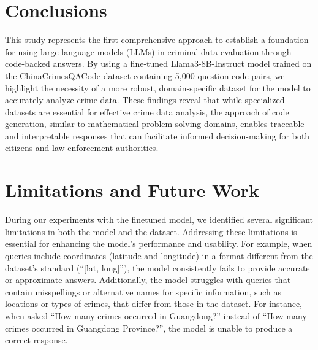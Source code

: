 
\section{Conclusions}



This study represents the first comprehensive approach to establish a foundation for using large language models (LLMs) in criminal data evaluation through code-backed answers. By using a fine-tuned Llama3-8B-Instruct model trained on the ChinaCrimesQACode dataset containing 5,000 question-code pairs, we highlight the necessity of a more robust, domain-specific dataset for the model to accurately analyze crime data. These findings reveal that while specialized datasets are essential for effective crime data analysis, the approach of code generation, similar to mathematical problem-solving domains, enables traceable and interpretable responses that can facilitate informed decision-making for both citizens and law enforcement authorities.



\section{Limitations and Future Work}

During our experiments with the finetuned model, we identified several significant limitations in both the model and the dataset. Addressing these limitations is essential for enhancing the model's performance and usability. For example, when queries include coordinates (latitude and longitude) in a format different from the dataset's standard (``[lat, long]''), the model consistently fails to provide accurate or approximate answers. Additionally, the model struggles with queries that contain misspellings or alternative names for specific information, such as locations or types of crimes, that differ from those in the dataset. For instance, when asked ``How many crimes occurred in Guangdong?'' instead of ``How many crimes occurred in Guangdong Province?'', the model is unable to produce a correct response.


